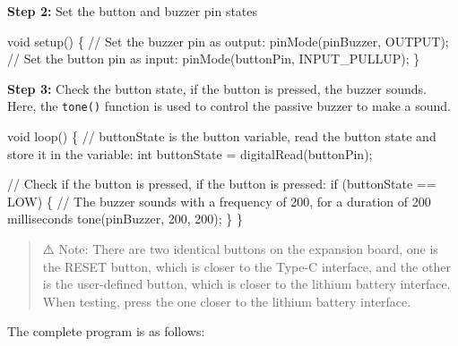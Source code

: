 \documentclass[
  letterpaper,
  DIV=11,
  numbers=noendperiod]{scrreprt}
\newenvironment{Shaded}{\begin{snugshade}}{\end{snugshade}}
\newcommand{\CommentTok}[1]{\textcolor[rgb]{0.37,0.37,0.37}{#1}}
\newcommand{\ControlFlowTok}[1]{\textcolor[rgb]{0.00,0.23,0.31}{#1}}
\newcommand{\DataTypeTok}[1]{\textcolor[rgb]{0.68,0.00,0.00}{#1}}
\newcommand{\DecValTok}[1]{\textcolor[rgb]{0.68,0.00,0.00}{#1}}
\newcommand{\NormalTok}[1]{\textcolor[rgb]{0.00,0.23,0.31}{#1}}
\newcommand{\OperatorTok}[1]{\textcolor[rgb]{0.37,0.37,0.37}{#1}}
\begin{document}
\textbf{Step 2:} Set the button and buzzer pin states

\begin{Shaded}
\begin{Highlighting}[]
\DataTypeTok{void}\NormalTok{ setup}\OperatorTok{()} \OperatorTok{\{}
    \CommentTok{// Set the buzzer pin as output:}
\NormalTok{    pinMode}\OperatorTok{(}\NormalTok{pinBuzzer}\OperatorTok{,}\NormalTok{ OUTPUT}\OperatorTok{);}
    \CommentTok{// Set the button pin as input:}
\NormalTok{    pinMode}\OperatorTok{(}\NormalTok{buttonPin}\OperatorTok{,}\NormalTok{ INPUT\_PULLUP}\OperatorTok{);}
\OperatorTok{\}}
\end{Highlighting}
\end{Shaded}

\textbf{Step 3:} Check the button state, if the button is pressed, the
buzzer sounds. Here, the \texttt{tone()} function is used to control the
passive buzzer to make a sound.

\begin{Shaded}
\begin{Highlighting}[]
\DataTypeTok{void}\NormalTok{ loop}\OperatorTok{()} \OperatorTok{\{}
    \CommentTok{// buttonState is the button variable, read the button state and store it in the variable:}
    \DataTypeTok{int}\NormalTok{ buttonState }\OperatorTok{=}\NormalTok{ digitalRead}\OperatorTok{(}\NormalTok{buttonPin}\OperatorTok{);}

    \CommentTok{// Check if the button is pressed, if the button is pressed:}
    \ControlFlowTok{if} \OperatorTok{(}\NormalTok{buttonState }\OperatorTok{==}\NormalTok{ LOW}\OperatorTok{)} \OperatorTok{\{}
        \CommentTok{// The buzzer sounds with a frequency of 200, for a duration of 200 milliseconds}
\NormalTok{        tone}\OperatorTok{(}\NormalTok{pinBuzzer}\OperatorTok{,} \DecValTok{200}\OperatorTok{,} \DecValTok{200}\OperatorTok{);}
    \OperatorTok{\}}
\OperatorTok{\}}
\end{Highlighting}
\end{Shaded}

\begin{quote}
⚠️ Note: There are two identical buttons on the expansion board, one is
the RESET button, which is closer to the Type-C interface, and the other
is the user-defined button, which is closer to the lithium battery
interface. When testing, press the one closer to the lithium battery
interface.
\end{quote}

The complete program is as follows:
\end{document}
